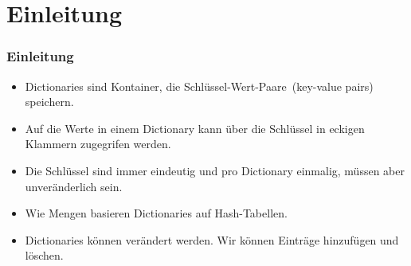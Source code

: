 \documentclass[aspectratio=169,mathserif,notheorems]{beamer}%
\subtitle{21.~Dictionaries bzw. Hash Maps}%
\begin{document}
%
%
\startPresentation%
%
\section{Einleitung}%
\begin{frame}[t]%
\frametitle{Einleitung}%
%
\begin{itemize}%
\item Dictionaries sind Kontainer, die Schlüssel-Wert-Paare~(key-value pairs) speichern.%
%
\item<2-> Auf die Werte in einem Dictionary kann über die Schlüssel in eckigen Klammern zugegrifen werden.%
%
\item<3-> Die Schlüssel sind immer eindeutig und pro Dictionary einmalig, müssen aber unveränderlich sein.%
%
\item<5-> Wie Mengen basieren Dictionaries auf Hash-Tabellen\cite{K1998SAS,CLRS2009ITA,SKS2019DSC}.
%
\item<6-> Dictionaries können verändert werden. Wir können Einträge hinzufügen und löschen.%
\end{itemize}%
%
%
%
\end{frame}%
%
%
\end{document}
